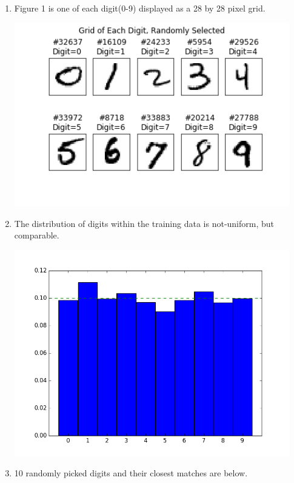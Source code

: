 \documentclass{report}
\begin{document}
\begin{enumerate}
\begin{enumerate}[label=(\alph*)]
		\item Figure 1 is one of each digit(0-9) displayed as a 28 by 28 pixel grid.  
		\begin{center}
		\includegraphics[width=12cm]{images/one_grid_x_each_digit.png}
		\end{center}
		\item The distribution of digits within the training data is not-uniform, but comparable. 
		\begin{center}
		\includegraphics[width=12cm]{images/distrib.png}
		\end{center}
		
		\item 10 randomly picked digits and their closest matches are below.
		

\end{enumerate}
\end{enumerate}
\end{document}
